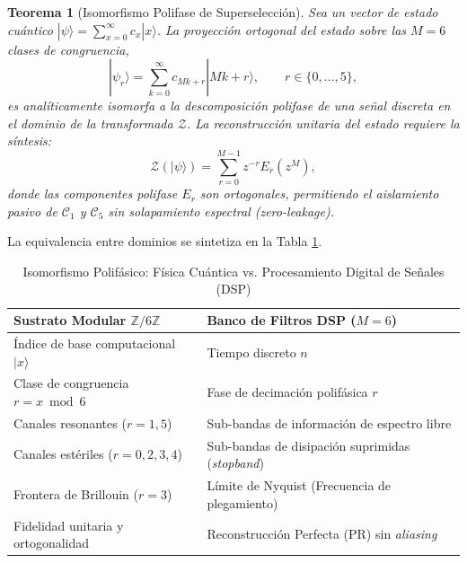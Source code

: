 \documentclass[12pt,a4paper]{article}
\theoremstyle{plain}
\newtheorem{teorema}{Teorema}[section]
\theoremstyle{definition}
\theoremstyle{remark}
\begin{document}
\begin{teorema}[Isomorfismo Polifase de Superselección]
Sea un vector de estado cuántico $|\psi\rangle = \sum_{x=0}^{\infty} c_x |x\rangle$. La proyección ortogonal del estado sobre las $M=6$ clases de congruencia,
\begin{equation}
|\psi_r\rangle = \sum_{k=0}^{\infty} c_{Mk + r} |Mk+r\rangle, \qquad r \in \{0,\dots,5\},
\end{equation}
es analíticamente isomorfa a la descomposición polifase de una señal discreta en el dominio de la transformada $\mathcal{Z}$. La reconstrucción unitaria del estado requiere la síntesis:
\begin{equation}
\mathcal{Z}(|\psi\rangle) = \sum_{r=0}^{M-1} z^{-r} E_r(z^M),
\end{equation}
donde las componentes polifase $E_r$ son ortogonales, permitiendo el aislamiento pasivo de $\mathcal{C}_1$ y $\mathcal{C}_5$ sin solapamiento espectral (\textit{zero-leakage}).
\end{teorema}

La equivalencia entre dominios se sintetiza en la Tabla \ref{tab:isomorfismo}.

\begin{table}[H]
\centering
\caption{Isomorfismo Polifásico: Física Cuántica vs. Procesamiento Digital de Señales (DSP)}
\label{tab:isomorfismo}
\begin{tabular}{ll}
\toprule
\textbf{Sustrato Modular $\mathbb{Z}/6\mathbb{Z}$} & \textbf{Banco de Filtros DSP ($M=6$)} \\
\midrule
Índice de base computacional $|x\rangle$ & Tiempo discreto $n$ \\
Clase de congruencia $r = x \bmod 6$ & Fase de decimación polifásica $r$ \\
Canales resonantes ($r=1,5$) & Sub-bandas de información de espectro libre \\
Canales estériles ($r=0,2,3,4$) & Sub-bandas de disipación suprimidas (\textit{stopband}) \\
Frontera de Brillouin ($r=3$) & Límite de Nyquist (Frecuencia de plegamiento) \\
Fidelidad unitaria y ortogonalidad & Reconstrucción Perfecta (PR) sin \textit{aliasing} \\
\bottomrule
\end{tabular}
\end{table}
\end{document}
